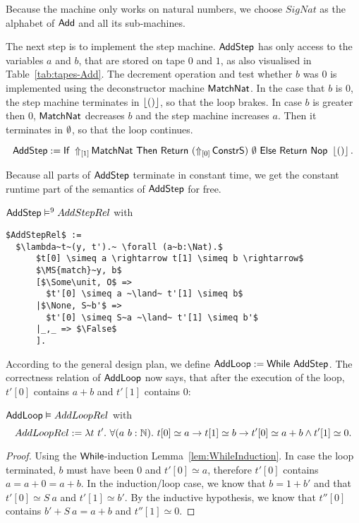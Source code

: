 Because the machine only works on natural numbers, we choose $SigNat$ as the alphabet of $\MS{Add}$ and all its sub-machines.

The next step is to implement the step machine.  $\MS{AddStep}$ has only access to the variables $a$ and $b$, that are stored on tape $0$ and $1$, as
also visualised in Table~\ref{tab:tapes-Add}.  The decrement operation and test whether $b$ was $0$ is implemented using the deconstructor machine
$\MS{MatchNat}$.  In the case that $b$ is $0$, the step machine terminates in $\Some\unit$, so that the loop brakes.  In case $b$ is greater then $0$,
$\MS{MatchNat}$ decreases $b$ and the step machine increases $a$.  Then it terminates in $\None$, so that the loop continues.
\begin{definition}[$\MS{AddStep}$]
  \label{def:Add_Step}
  \[
    \MS{AddStep} := \If{\LiftTapes{\MS{MatchNat}}{\Vector{1}}}{\Return{(\LiftTapes{\MS{ConstrS}}{\Vector{0}})}{\None}}{\Return{\Nop}{\Some\unit}}.
  \]
\end{definition}

Because all parts of $\MS{AddStep}$ terminate in constant time, we get the constant runtime part of the semantics of $\MS{AddStep}$ for free.
\begin{lemma}
  \label{lem:Add_Step_Sem}
  $\MS{AddStep} \RealiseIn{9} AddStepRel$ with
\begin{lstlisting}[style=semicoqstyle]
$AddStepRel$ :=
  $\lambda~t~(y, t').~ \forall (a~b:\Nat).$
      $t[0] \simeq a \rightarrow t[1] \simeq b \rightarrow$
      $\MS{match}~y, b$
      [$\Some\unit, O$ =>
        $t'[0] \simeq a ~\land~ t'[1] \simeq b$
      |$\None, S~b'$ =>
        $t'[0] \simeq S~a ~\land~ t'[1] \simeq b'$
      |_,_ => $\False$
      ].
\end{lstlisting}
\end{lemma}

According to the general design plan, we define $\MS{AddLoop} := \While~\MS{AddStep}$.  The correctness relation of $\MS{AddLoop}$ now says, that
after the execution of the loop, $t'[0]$ contains $a+b$ and $t'[1]$ contains $0$:
\begin{lemma}
  \label{lem:Add_Loop_Realise}
  $\MS{AddLoop} \Realise AddLoopRel$ with
  \[
    AddLoopRel := \lambda t~t'.~\forall (a~b:\Nat).~t[0] \simeq a \rightarrow t[1] \simeq b \rightarrow t'[0] \simeq a+b \land t'[1] \simeq 0.
  \]
\end{lemma}
\begin{proof}
  Using the $\While$-induction Lemma~\ref{lem:WhileInduction}.  In case the loop terminated, $b$ must have been $0$ and $t'[0] \simeq a$, therefore
  $t'[0]$ contains $a=a+0=a+b$.  In the induction/loop case, we know that $b=1+b'$ and that $t'[0] \simeq S~a$ and $t'[1] \simeq b'$.  By the
  inductive hypothesis, we know that $t''[0]$ contains $b' + S~a = a+b$ and $t''[1] \simeq 0$.
\end{proof}

